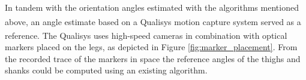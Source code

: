\begin{itemize}


  \end{itemize}

In tandem with the orientation angles estimated with the algorithms mentioned above, an angle estimate based on a Qualisys\textsuperscript{\textregistered} motion capture system served as a reference. The Qualisys\textsuperscript{\textregistered} uses high-speed cameras in combination with optical markers placed on the legs, as depicted in Figure \ref{fig:marker_placement}. From the recorded trace of the markers in space the reference angles of the thighs and shanks could be computed using an existing algorithm.

